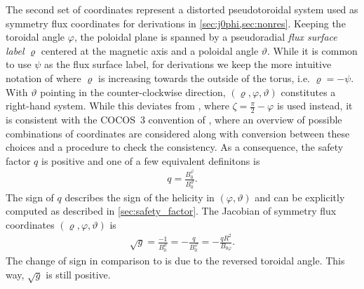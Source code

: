 \documentclass[a4paper, twoside, 10pt, english]{article}
\numberwithin{equation}{section}
\let\temp\varrho
\let\varrho\rho
\let\rho\temp
\let\temp\vartheta
\let\vartheta\theta
\let\theta\temp
\let\temp\varphi
\let\varphi\phi
\let\phi\temp
\begin{document}
The second set of coordinates represent a distorted pseudotoroidal system used as symmetry flux coordinates for derivations in \cref{sec:j0phi,sec:nonres}. Keeping the toroidal angle $\phi$, the poloidal plane is spanned by a pseudoradial \emph{flux surface label} $\rho$ centered at the magnetic axis and a poloidal angle $\theta$. While it is common to use $\psi$ as the flux surface label, for derivations we keep the more intuitive notation of \textcite{dHaeseleer91} where $\rho$ is increasing towards the outside of the torus, i.e. $\rho = -\psi$. With $\theta$ pointing in the counter-clockwise direction, $(\rho, \phi, \theta)$ constitutes a right-hand system. While this deviates from \textcite{dHaeseleer91}, where $\zeta = \frac{\pi}{2} - \phi$ is used instead, it is consistent with the COCOS~3 convention of \textcite{Sauter13}, where an overview of possible combinations of coordinates are considered along with conversion between these choices and a procedure to check the consistency. As a consequence, the safety factor $q$ is positive and one of a few equivalent definitons is
\begin{gather}
  q = \frac{B_{0}^{\phi}}{B_{0}^{\theta}}. \label{eq:q_field_line_pitch}
\end{gather}
The sign of $q$ describes the sign of the helicity in $(\phi, \theta)$ and can be explicitly computed as described in \cref{sec:safety_factor}. The Jacobian of symmetry flux coordinates $(\rho, \phi, \theta)$ is
\begin{gather}
  \sqrt{g} = \frac{-1}{B_{0}^{\theta}} = -\frac{q}{B_{0}^{\phi}} = -\frac{q R^{2}}{B_{0 \phi}}. \label{eq:flux_metric}
\end{gather}
The change of sign in comparison to \textcite{dHaeseleer91} is due to the reversed toroidal angle. This way, $\sqrt{g}$ is still positive.
\end{document}
